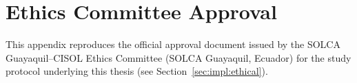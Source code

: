 \chapter{Ethics Committee Approval}
\label{app:ethics}

This appendix reproduces the official approval document issued by the SOLCA Guayaquil--CISOL Ethics Committee (SOLCA Guayaquil, Ecuador) for the study protocol underlying this thesis (see Section~\ref{sec:impl:ethical}).

